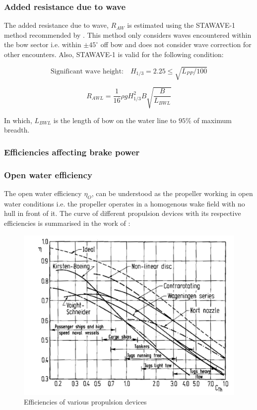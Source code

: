 \subsubsection{Added resistance due to wave}\label{sec:wave_resistance}

The added resistance due to wave, $R_{AW}$ is estimated using the STAWAVE-1 method recommended by . This method only considers waves encountered within the bow sector i.e. within $\pm 45^\circ$ off bow and does not consider wave correction for other encounters. Also, STAWAVE-1 is valid for the following condition:

\begin{equation}
    \label{eqn:stawave_cond1}
    \text {Significant wave height:} \quad H_{1/3} = 2.25\leqslant\sqrt{L_{PP}/100} 
\end{equation}

\begin{equation}
    \label{eqn:stawave1}
    R_{AWL} = \frac{1}{16}\rho g H_{1/3}^2 B \sqrt{\frac{B}{L_{BWL}}} 
\end{equation}

In which, $L_{BWL}$ is the length of bow on the water line to $95\%$ of maximum breadth.

\subsubsection{Efficiencies affecting brake power}\label{sec:Pb_efficiency}

\subsubsection*{Open water efficiency}

The open water efficiency $\eta_O$, can be understood as the propeller working in open water conditions i.e. the propeller operates in a homogenous wake field with no hull in front of it. The curve of different propulsion devices with its respective efficiencies is summarised in the work of :

\begin{figure}[ht]
    \centering
        \includegraphics[width=.8\textwidth]{02_figures/Breslin94_openwater_eff.jpg}
        \caption{Efficiencies of various propulsion devices }
        \label{fig:breslin_open water efficiencies}
\end{figure}


